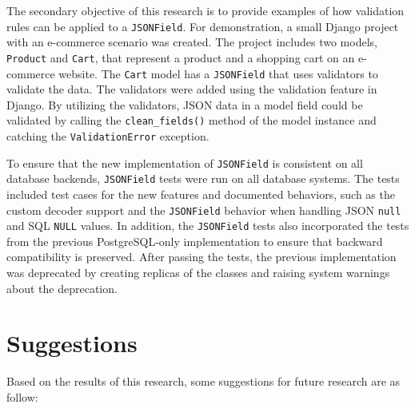The secondary objective of this research is to provide examples of how
validation rules can be applied to a \verb|JSONField|. For demonstration, a
small Django project with an e-commerce scenario was created. The project
includes two models, \verb|Product| and \verb|Cart|, that represent a product
and a shopping cart on an e-commerce website. The \verb|Cart| model has a
\verb|JSONField| that uses validators to validate the data. The validators were
added using the validation feature in Django. By utilizing the validators, JSON
data in a model field could be validated by calling the \verb|clean_fields()|
method of the model instance and catching the \verb|ValidationError| exception.

To ensure that the new implementation of \verb|JSONField| is consistent on all
database backends, \verb|JSONField| tests were run on all database systems. The
tests included test cases for the new features and documented behaviors, such
as the custom decoder support and the \verb|JSONField| behavior when handling
JSON \verb|null| and SQL \verb|NULL| values. In addition, the \verb|JSONField|
tests also incorporated the tests from the previous PostgreSQL-only
implementation to ensure that backward compatibility is preserved. After
passing the tests, the previous implementation was deprecated by creating
replicas of the classes and raising system warnings about the deprecation.

\section{Suggestions}
Based on the results of this research, some suggestions for future research are
as follow:

